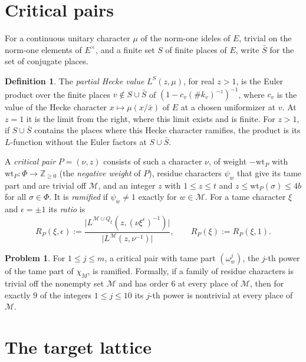 \documentclass[reqno]{amsart}
\theoremstyle{plain}
\theoremstyle{definition}
\newtheorem{problem}{Problem}[section]
\newtheorem{definition}[theorem]{Definition}
\newcommand{\Z}{{\mathbb{Z}}}
\begin{document}
\section{Critical pairs}\label{sec:pairs}

For a continuous unitary character \(\mu\) of the norm-one ideles of \(E\), trivial on the norm-one elements of \(E^\times\), and a finite set \(S\) of finite places of \(E\), write \(\bar S\) for the set of conjugate places.

\begin{definition}\label{def:pair}
The \emph{partial Hecke value} \(L^S(z, \mu)\), for real \(z > 1\), is the Euler product over the finite places \(v \notin S \cup \bar S\) of \((1 - c_v (\#k_v)^{-z})^{-1}\), where \(c_v\) is the value of the Hecke character \(x \mapsto \mu(x/\bar x)\) of \(E\) at a chosen uniformizer at \(v\).  At \(z = 1\) it is the limit from the right, where this limit exists and is finite.  For \(z > 1\), if \(S \cup \bar S\) contains the places where this Hecke character ramifies, the product is its \(L\)-function without the Euler factors at \(S \cup \bar S\).

A \emph{critical pair} \(P = (\nu, z)\) consists of such a character \(\nu\), of weight \(-\mathrm{wt}_P\) with \(\mathrm{wt}_P \colon \Phi \to \Z_{\ge 0}\) (the \emph{negative weight} of \(P\)), residue characters \(\psi_w\) that give its tame part and are trivial off \(\mathcal M\), and an integer \(z\) with \(1 \le z \le t\) and \(z \le \mathrm{wt}_P(\sigma) \le 4b\) for all \(\sigma \in \Phi\).  It is \emph{ramified} if \(\psi_w \ne 1\) exactly for \(w \in \mathcal M\).  For a tame character \(\xi\) and \(\epsilon = \pm1\) its \emph{ratio} is
\[
  R_P(\xi, \epsilon) := \frac{\lvert L^{\mathcal M \cup Q_\xi}(z, (\nu\xi^{\epsilon})^{-1})\rvert}{\lvert L^{\mathcal M}(z, \nu^{-1})\rvert}, \qquad R_P(\xi) := R_P(\xi, 1) .
\]
\end{definition}

\begin{problem}\label{pr:ramified-pair}
For \(1 \le j \le m\), a critical pair with tame part \((\omega_w^j)\), the \(j\)-th power of the tame part of \(\chi_M\), is ramified.  Formally, if a family of residue characters is trivial off the nonempty set \(\mathcal M\) and has order \(6\) at every place of \(\mathcal M\), then for exactly \(9\) of the integers \(1 \le j \le 10\) its \(j\)-th power is nontrivial at every place of \(\mathcal M\).
\end{problem}

\section{The target lattice}\label{sec:lattice}
\end{document}
